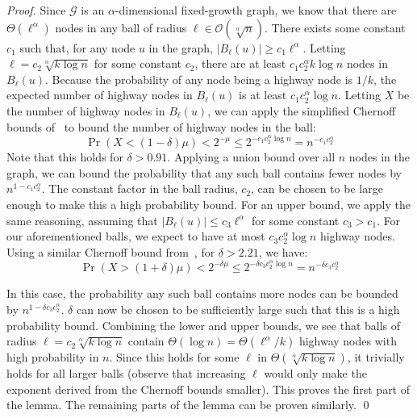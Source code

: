 \begin{proof}
    Since $\mathcal{G}$ is an $\alpha$-dimensional fixed-growth graph, we know
    that there are $\Theta(\ell^\alpha)$ nodes in any ball of radius $\ell \in
    \mathcal{O}(\sqrt[\alpha]{n})$.
    There exists some constant $c_1$ such that, for any node $u$ in the graph,
    $|B_\ell(u)| \geq c_1 \ell^\alpha$.
    Letting $\ell = c_2 \sqrt[\alpha]{k \log{n}}$ for some constant $c_2$, there
    are at least $c_1 c_2^\alpha k \log{n}$ nodes in $B_\ell(u)$.
    Because the probability of any node being a highway node is $1/k$, the
    expected number of highway nodes in $B_\ell(u)$ is at least $c_1
    c_2^\alpha \log{n}$.
    Letting $X$ be the number of highway nodes in $B_\ell(u)$, we can apply the
    simplified Chernoff bounds of~\cite{DILLENCOURT2023106397} to bound the number
    of highway nodes in the ball:
    \begin{equation*}
        \Pr(X < (1 - \delta) \mu) < 2^{-\mu} \leq 2^{-c_1 c_2^\alpha \log{n}} = n^{-c_1 c_2^\alpha}
    \end{equation*}
    Note that this holds for $\delta > 0.91$.
    Applying a union bound over all $n$ nodes in the graph, we can bound the
    probability that any such ball contains fewer nodes by $n^{1 - c_1
    c_2^\alpha}$.
    The constant factor in the ball radius, $c_2$, can be chosen to be large
    enough to make this a high probability bound.
    For an upper bound, we apply the same reasoning, assuming that $|B_\ell(u)|
    \le c_3 \ell^\alpha$ for some constant $c_3 > c_1$.
    For our aforementioned balls, we expect to have at most $c_3 c_2^\alpha
    \log{n}$ highway nodes.
    Using a similar Chernoff bound from~\cite{DILLENCOURT2023106397}, for
    $\delta > 2.21$, we have:
    \begin{equation*}
        \Pr(X > (1 + \delta) \mu) < 2^{-\delta \mu} \leq 2^{-\delta c_3 c_2^\alpha \log{n}} = n^{-\delta c_3 c_2^\alpha}
    \end{equation*}

    In this case, the probability any such ball contains more nodes can be
    bounded by $n^{1 - \delta c_3 c_2^\alpha}$.
    $\delta$ can now be chosen to be sufficiently large such that this is a high
    probability bound.
    Combining the lower and upper bounds, we see that balls of radius $\ell =
    c_2 \sqrt[\alpha]{k \log{n}}$ contain $\Theta(\log{n}) = \Theta(\ell^\alpha
    / k)$ highway nodes with high probability in $n$.
    Since this holds for some $\ell$ in $\Theta(\sqrt[\alpha]{k \log{n}})$, it
    trivially holds for all larger balls 
    (observe that increasing $\ell$ would only make the exponent 
    derived from the Chernoff bounds smaller).
    This proves the first part of the lemma.
    The remaining parts of the lemma can be proven similarly.
    \qed
\end{proof}

